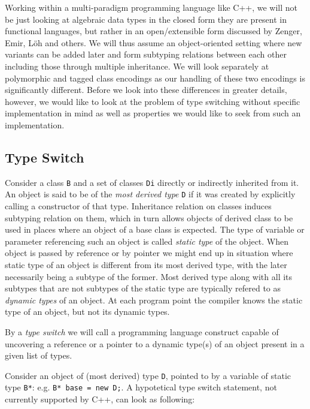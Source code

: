 \documentclass[preprint]{sigplanconf}
\makeatletter
\DeclareRobustCommand{\code}[1]{{\lstinline[breaklines=false,escapechar=@]{#1}}}
\makeatother
\begin{document}
Working within a multi-paradigm programming language like C++, we will not be 
just looking at algebraic data types in the closed form they are present in 
functional languages, but rather in an open/extensible form discussed by 
Zenger\cite{Zenger:2001}, Emir\cite{EmirThesis}, L\"oh\cite{LohHinze2006} and others. We will thus 
assume an object-oriented setting where new variants can be added later and form
subtyping relations between each other including those through multiple 
inheritance. We will look separately at polymorphic and tagged class encodings 
as our handling of these two encodings is significantly different. Before we 
look into these differences in greater details, however, we would like to look 
at the problem of type switching without specific implementation in mind as well 
as properties we would like to seek from such an implementation.

\subsection{Type Switch}

Consider a class \code{B} and a set of classes \code{Di} directly or indirectly 
inherited from it. An object is said to be of the \emph{most derived type} 
\code{D} if it was created by explicitly calling a constructor of that type.
Inheritance relation on classes induces subtyping relation on them, which in 
turn allows objects of derived class to be used in places where an object of a 
base class is expected. The type of variable or parameter referencing such an
object is called \emph{static type} of the object. When object is passed by 
reference or by pointer we might end up in situation where static type of an 
object is different from its most derived type, with the later necessarily 
being a subtype of the former. Most derived type along with all its subtypes 
that are not subtypes of the static type are typically refered to as 
\emph{dynamic types} of an object. At each program point the compiler knows the 
static type of an object, but not its dynamic types.

By a \emph{type switch} we will call a programming language construct capable of 
uncovering a reference or a pointer to a dynamic type(s) of an object present in 
a given list of types.

Consider an object of (most derived) type \code{D}, pointed to by a variable of 
static type \code{B*}: e.g. \code{B* base = new D;}. A hypotetical type switch 
statement, not currently supported by C++, can look as following:
\end{document}
